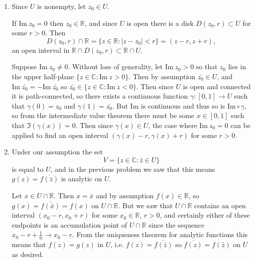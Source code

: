 \documentclass{article}
\begin{document}
\begin{Answer}
  \begin{enumerate}
    \item{
      Since $U$ is nonempty, let $z_0 \in U$.

      If $\mathrm{Im}~z_0 = 0$
      then $z_0 \in \mathbb{R}$, and since $U$ is open there is a disk
      $D(z_0, r) \subset U$ for some $r > 0$. Then
      $$
        D(z_0, r) \cap \mathbb{R}
      = \{ z \in \mathbb{R} : |z - z_0| < r \}
      = (z-r, z+r),
      $$
      an open interval in
      $\mathbb{R} \cap D(z_0, r) \subset \mathbb{R} \cap U$.

      Suppose $\mathrm{Im}~z_0 \neq 0$. Without loss of generality,
      let $\mathrm{Im}~z_0 > 0$ so that $z_0$ lies in the upper half-plane
      $\{ z \in \mathbb{C} : \mathrm{Im}~z > 0 \}$. Then
      by assumption $\bar{z_0} \in U$, and
      $\mathrm{Im}~\bar{z_0} = -\mathrm{Im}~\bar{z_0}$ so
      $\bar{z_0} \in \{ z \in \mathbb{C} : \mathrm{Im}~z < 0 \}$.
      Then since $U$ is open and connected it is path-connected, so
      there exists a continuous function $\gamma: [0, 1] \to U$ such
      that $\gamma(0) = z_0$ and $\gamma(1) = \bar{z_0}$. But
      $\mathrm{Im}$ is continuous and thus so is
      $\mathrm{Im} \circ \gamma$, so from the intermediate value
      theorem there must be some $x \in [0, 1]$ such that
      $\Im(\gamma(x)) = 0$. Then since $\gamma(x) \in U$, the case
      where $\mathrm{Im}~z_0 = 0$ can be applied to find an open
      interval $(\gamma(x) - r, \gamma(x) + r)$ for some $r > 0$.
    }
    \item{
      Under our assumption the set
      $$
      V = \{ z \in \mathbb{C} : \bar{z} \in U \}
      $$
      is equal to $U$, and in the previous problem we saw that
      this means $g(z) = \overline{f(\bar{z})}$ is analytic on
      $U$.

      Let $x \in U \cap \mathbb{R}$. Then
      $x = \bar{x}$ and by assumption $f(x) \in \mathbb{R}$,
      so $g(x) = \overline{f(\bar{x})} = f(x)$ on $U \cap \mathbb{R}$.
      But we saw that $U \cap \mathbb{R}$ contains an open
      interval $(x_0 - r, x_0 + r)$ for some $x_0 \in \mathbb{R}$,
      $r > 0$, and certainly either of these endpoints is an
      accumulation point of $U \cap \mathbb{R}$ since
      the sequence $x_0 - r + \frac{1}{n} \to x_0 - r$.
      From the uniqueness theorem for analytic functions this means
      that $f(z) = g(z)$ in $U$, i.e. $f(z) = \overline{f(\bar{z})}$ so
      $\overline{f(z)} = f(\bar{z})$ on $U$ as desired.
    }
  \end{enumerate}
\end{Answer}
\end{document}
